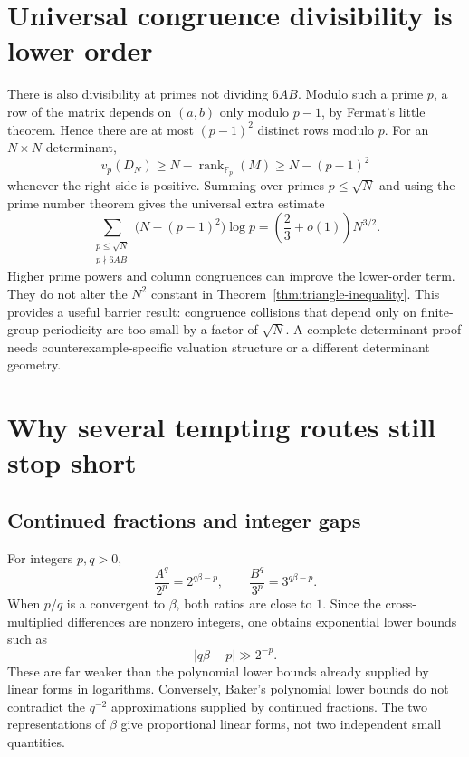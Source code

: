 \documentclass[11pt]{article}
\theoremstyle{definition}
\begin{document}
\section{Universal congruence divisibility is lower order}

There is also divisibility at primes not dividing $6AB$.  Modulo such a prime
$p$, a row of the matrix depends on $(a,b)$ only modulo $p-1$, by Fermat's
little theorem.  Hence there are at most $(p-1)^2$ distinct rows modulo $p$.
For an $N\times N$ determinant,
\[
 v_p(D_N)\ge N-\operatorname{rank}_{\mathbb F_p}(M)
 \ge N-(p-1)^2
\]
whenever the right side is positive.  Summing over primes $p\le\sqrt N$ and
using the prime number theorem gives the universal extra estimate
\begin{equation}\label{eq:congruence-gain}
 \sum_{\substack{p\le\sqrt N\\p\nmid6AB}}
  \bigl(N-(p-1)^2\bigr)\log p
 =\left(\frac23+o(1)\right)N^{3/2}.
\end{equation}
Higher prime powers and column congruences can improve the lower-order term.
They do not alter the $N^2$ constant in
Theorem~\ref{thm:triangle-inequality}.  This provides a useful barrier result:
congruence collisions that depend only on finite-group periodicity are too
small by a factor of $\sqrt N$.  A complete determinant proof needs
counterexample-specific valuation structure or a different determinant
geometry.

\section{Why several tempting routes still stop short}

\subsection{Continued fractions and integer gaps}

For integers $p,q>0$,
\[
 \frac{A^q}{2^p}=2^{q\beta-p},\qquad
 \frac{B^q}{3^p}=3^{q\beta-p}.
\]
When $p/q$ is a convergent to $\beta$, both ratios are close to $1$.  Since the
cross-multiplied differences are nonzero integers, one obtains exponential
lower bounds such as
\[
 |q\beta-p|\gg 2^{-p}.
\]
These are far weaker than the polynomial lower bounds already supplied by
linear forms in logarithms.  Conversely, Baker's polynomial lower bounds do
not contradict the $q^{-2}$ approximations supplied by continued fractions.
The two representations of $\beta$ give proportional linear forms, not two
independent small quantities.
\end{document}
